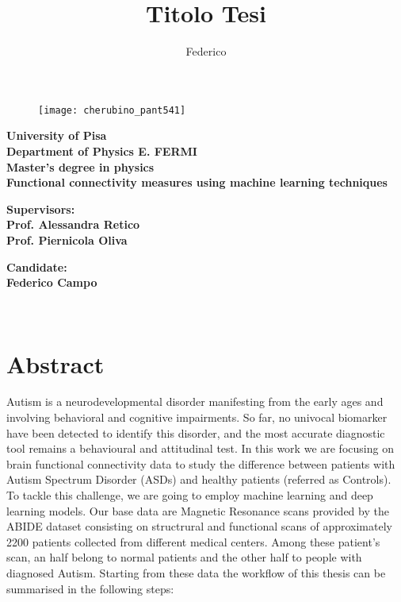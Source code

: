 \documentclass[10pt]{report}
\title{Titolo Tesi}
\author{Federico}
\begin{document}
\begin{titlepage}
\begin{figure}[t]
\centering
\texttt{[image: cherubino\_pant541]}
\end{figure}

\begin{center}
	\textbf{University of Pisa \\ Department of Physics E. FERMI\\ Master's degree in physics\\}
	\vspace{20mm}
    {\LARGE{\bf Functional connectivity measures using machine learning techniques}}
\end{center}

\vspace{36mm}
\begin{minipage}[t]{0.47\textwidth}
	{\large{\bf Supervisors:\\ Prof. Alessandra Retico\\ Prof. Piernicola Oliva}}
\end{minipage}\hfill\begin{minipage}[t]{0.47\textwidth}\raggedleft
	{\large{\bf Candidate: \\ Federico Campo}}
\end{minipage}

\vspace{60mm}
\hrulefill
\\

\end{titlepage}


\tableofcontents

\chapter*{Abstract}
Autism is a neurodevelopmental disorder manifesting from the early ages and involving behavioral and cognitive impairments. So far, no univocal biomarker have been detected to identify this disorder, and the most accurate diagnostic tool remains a behavioural and attitudinal test.
In this work we are focusing on brain functional connectivity data to study the difference between patients with Autism Spectrum Disorder (ASDs) and healthy patients (referred as Controls). To tackle this challenge, we are going to employ machine learning and deep learning models.
Our base data are Magnetic Resonance scans provided by the ABIDE dataset consisting on structrural and functional scans of approximately 2200 patients collected from different medical centers.
Among these patient's scan, an half belong to normal patients and the other half to people with diagnosed Autism.
Starting from these data the workflow of this thesis can be summarised in the following steps:
\end{document}
